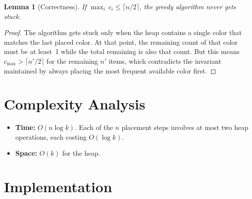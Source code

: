 \documentclass[11pt,a4paper]{article}
\newtheorem{lemma}[theorem]{Lemma}
\begin{document}
\begin{lemma}[Correctness]
If $\max_i\, c_i \le \lceil n/2 \rceil$, the greedy algorithm never gets
stuck.
\end{lemma}
\begin{proof}
The algorithm gets stuck only when the heap contains a single color that
matches the last placed color. At that point, the remaining count of that
color must be at least~1 while the total remaining is also that count. But
this means $c_{\max} > \lceil n'/2 \rceil$ for the remaining $n'$ items,
which contradicts the invariant maintained by always placing the most frequent
available color first.
\end{proof}

\section{Complexity Analysis}

\begin{itemize}
  \item \textbf{Time:} $O(n \log k)$. Each of the $n$ placement steps
    involves at most two heap operations, each costing $O(\log k)$.
  \item \textbf{Space:} $O(k)$ for the heap.
\end{itemize}

\section{Implementation}
\end{document}
